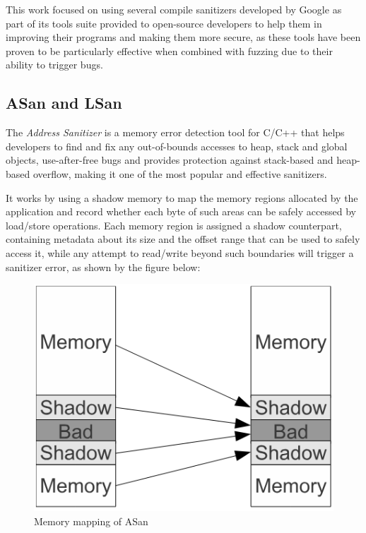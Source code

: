 This work focused on using several compile sanitizers developed by Google \cite{san_repo} as part of its tools suite provided to open-source developers to help them in improving their programs and making them more secure, as these tools have been proven to be particularly effective when combined with fuzzing due to their ability to trigger bugs.




\newpage
\subsection{ASan and LSan}
The \textit{Address Sanitizer} \cite{serebryany2012addresssanitizer} is a memory error detection tool for C/C++ that helps developers to find and fix any out-of-bounds accesses to heap, stack and global objects, use-after-free bugs and provides protection against stack-based and heap-based overflow, making it one of the most popular and effective sanitizers.

It works by using a shadow memory to map the memory regions allocated by the application and record whether each byte of such areas can be safely accessed by load/store operations. Each memory region is assigned a shadow counterpart, containing metadata about its size and the offset range that can be used to safely access it, while any attempt to read/write beyond such boundaries will trigger a sanitizer error, as shown by the figure below:

\begin{figure}[h]
\centering
\includegraphics[scale=0.6]{foto/shadow_memory.png}
\caption{Memory mapping of ASan \cite{serebryany2012addresssanitizer}}
\label{fig:asan_shadow}
\end{figure}

